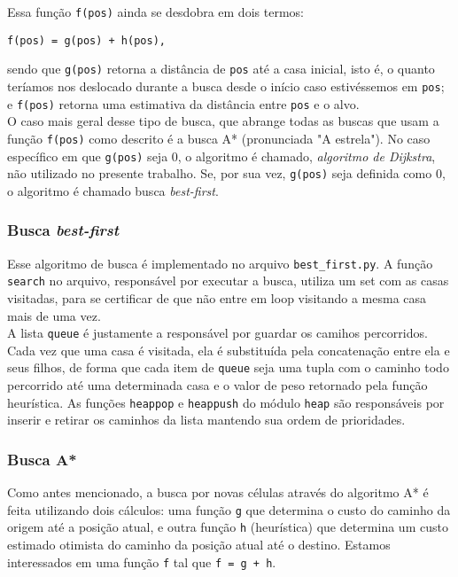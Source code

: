 \documentclass{article}
\begin{document}
Essa função \verb|f(pos)| ainda se desdobra em dois termos:

\begin{verbatim}
f(pos) = g(pos) + h(pos),
\end{verbatim}

sendo que \verb|g(pos)| retorna a distância de \verb|pos| até a casa inicial, isto é, o quanto teríamos nos deslocado durante a busca desde o início caso estivéssemos em \verb|pos|; e \verb|f(pos)| retorna uma estimativa da distância entre \verb|pos| e o alvo.\\

O caso mais geral desse tipo de busca, que abrange todas as buscas que usam a função \verb|f(pos)| como descrito é a busca A* (pronunciada "A estrela"). No caso específico em que \verb|g(pos)| seja 0, o algoritmo é chamado, \emph{algoritmo de Dijkstra}, não utilizado no presente trabalho. Se, por sua vez, \verb|g(pos)| seja definida como 0, o algoritmo é chamado busca \emph{best-first}.


\subsubsection{Busca \emph{best-first}}

Esse algoritmo de busca é implementado no arquivo \verb|best_first.py|.
A função \verb|search| no arquivo, responsável por executar a busca, utiliza um set com as casas visitadas, para se certificar de que não entre em loop visitando a mesma casa mais de uma vez.\\

A lista \verb|queue| é justamente a responsável por guardar os camihos percorridos. Cada vez que uma casa é visitada, ela é substituída pela concatenação entre ela e seus filhos, de forma que cada item de \verb|queue| seja uma tupla com o caminho todo percorrido até uma determinada casa e o valor de peso retornado pela função heurística. As funções \verb|heappop| e \verb|heappush| do módulo \verb|heap| são responsáveis por inserir e retirar os caminhos da lista mantendo sua ordem de prioridades.
\subsubsection{Busca A*}
Como antes mencionado, a busca por novas células através do algoritmo A* é feita utilizando dois cálculos: uma função \verb|g| que determina o custo do caminho da origem até a posição atual, e outra função \verb|h| (heurística) que determina um custo estimado otimista do caminho da posição atual até o destino. Estamos interessados em uma função \verb|f| tal que \verb|f = g + h|.\\
\end{document}
